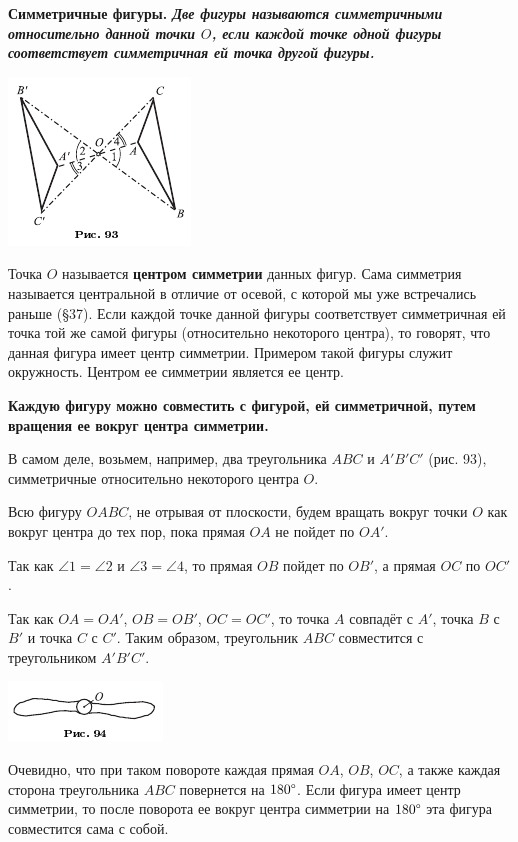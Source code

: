 \documentclass[oneside]{book}
\begin{document}
\textbf{Симметричные фигуры.
\emph{Две фигуры называются симметричными относительно данной точки $O$, если каждой точке одной фигуры соответствует симметричная ей точка другой фигуры.}}

\includegraphics{pics/ris-93}

Точка $O$ называется \textbf{центром симметрии} данных фигур.
Сама симметрия называется центральной в отличие от осевой, с которой мы уже встречались раньше (§37).
Если каждой точке данной фигуры соответствует симметричная ей точка той же самой фигуры (относительно некоторого центра), то говорят, что данная фигура имеет центр симметрии.
Примером такой фигуры служит окружность.
Центром ее симметрии является ее центр.

\textbf{Каждую фигуру можно совместить с фигурой, ей симметричной, путем вращения ее вокруг центра симметрии.}

В самом деле, возьмем, например, два треугольника $ABC$ и $A'B'C'$ (рис. 93), симметричные относительно некоторого центра $O$.

Всю фигуру $OABC$, не отрывая от плоскости, будем вращать вокруг точки $O$ как вокруг центра до тех пор, пока прямая $OA$ не пойдет по $OA'$.

Так как $\angle 1 = \angle 2$ и $\angle 3 = \angle 4$, то прямая $OB$ пойдет по $OB'$, а прямая $OC$ по $OC'$.

Так как $OA = OA'$, $OB=OB'$, $OC=OC'$, то точка $A$ совпадёт с $A'$, точка $B$ с $B'$ и точка $C$ с $C'$.
Таким образом, треугольник $ABC$ совместится с треугольником $A'B'C'$.

\includegraphics{pics/ris-94}

Очевидно, что при таком повороте каждая прямая $OA$, $OB$, $OC$, а также каждая сторона треугольника $ABC$ повернется на $180\degree$.
Если фигура имеет центр симметрии, то после поворота ее вокруг центра симметрии на $180\degree$ эта фигура совместится сама с собой.
\end{document}
